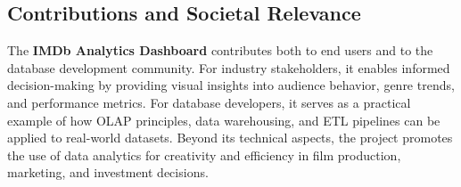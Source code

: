 \documentclass[sigconf, pbalance]{acmart}
\begin{document}
\subsection{Contributions and Societal Relevance}

The \textbf{IMDb Analytics Dashboard} contributes both to end users and to the database development community. For industry stakeholders, it enables informed decision-making by providing visual insights into audience behavior, genre trends, and performance metrics. For database developers, it serves as a practical example of how OLAP principles, data warehousing, and ETL pipelines can be applied to real-world datasets. Beyond its technical aspects, the project promotes the use of data analytics for creativity and efficiency in film production, marketing, and investment decisions.






\end{document}
